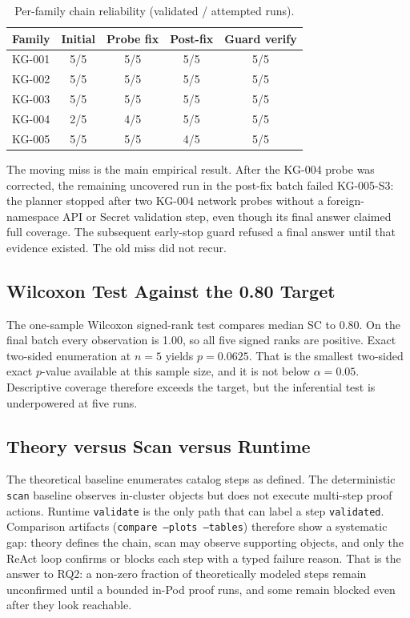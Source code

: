 \documentclass[conference]{IEEEtran}
\begin{document}
\begin{table}[t]
\centering
\caption{Per-family chain reliability (validated / attempted runs).}
\label{tab:family_rel}
\scriptsize
\begin{tabular}{lcccc}
\toprule
\textbf{Family} & \textbf{Initial} & \textbf{Probe fix} & \textbf{Post-fix} & \textbf{Guard verify} \\
\midrule
KG-001 & 5/5 & 5/5 & 5/5 & 5/5 \\
KG-002 & 5/5 & 5/5 & 5/5 & 5/5 \\
KG-003 & 5/5 & 5/5 & 5/5 & 5/5 \\
KG-004 & 2/5 & 4/5 & 5/5 & 5/5 \\
KG-005 & 5/5 & 5/5 & 4/5 & 5/5 \\
\bottomrule
\end{tabular}
\end{table}

The moving miss is the main empirical result. After the KG-004 probe was corrected, the remaining uncovered run in the post-fix batch failed KG-005-S3: the planner stopped after two KG-004 network probes without a foreign-namespace API or Secret validation step, even though its final answer claimed full coverage. The subsequent early-stop guard refused a final answer until that evidence existed. The old miss did not recur.

\subsection{Wilcoxon Test Against the 0.80 Target}

The one-sample Wilcoxon signed-rank test compares median SC to 0.80. On the final batch every observation is 1.00, so all five signed ranks are positive. Exact two-sided enumeration at $n=5$ yields $p=0.0625$. That is the smallest two-sided exact $p$-value available at this sample size, and it is not below $\alpha=0.05$. Descriptive coverage therefore exceeds the target, but the inferential test is underpowered at five runs.

\subsection{Theory versus Scan versus Runtime}

The theoretical baseline enumerates catalog steps as defined. The deterministic \texttt{scan} baseline observes in-cluster objects but does not execute multi-step proof actions. Runtime \texttt{validate} is the only path that can label a step \texttt{validated}. Comparison artifacts (\texttt{compare --plots --tables}) therefore show a systematic gap: theory defines the chain, scan may observe supporting objects, and only the ReAct loop confirms or blocks each step with a typed failure reason. That is the answer to RQ2: a non-zero fraction of theoretically modeled steps remain unconfirmed until a bounded in-Pod proof runs, and some remain blocked even after they look reachable.
\end{document}
